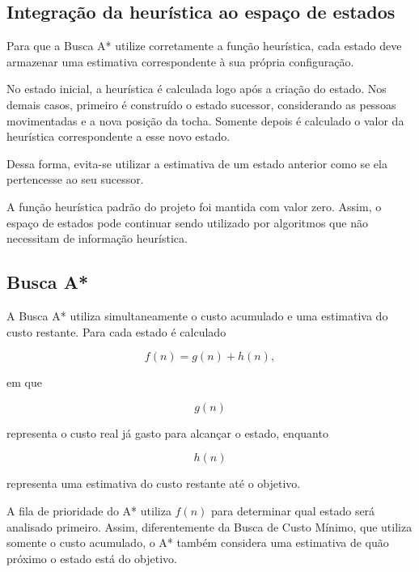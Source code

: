 \documentclass[12pt,a4paper]{article}
\begin{document}
\subsection{Integração da heurística ao espaço de estados}

Para que a Busca A* utilize corretamente a função heurística, cada estado deve
armazenar uma estimativa correspondente à sua própria configuração.

No estado inicial, a heurística é calculada logo após a criação do estado. Nos
demais casos, primeiro é construído o estado sucessor, considerando as pessoas
movimentadas e a nova posição da tocha. Somente depois é calculado o valor da
heurística correspondente a esse novo estado.

Dessa forma, evita-se utilizar a estimativa de um estado anterior como se ela
pertencesse ao seu sucessor.

A função heurística padrão do projeto foi mantida com valor zero. Assim, o
espaço de estados pode continuar sendo utilizado por algoritmos que não
necessitam de informação heurística.




\subsection{Busca A*}

A Busca A* utiliza simultaneamente o custo acumulado e uma estimativa do custo
restante. Para cada estado é calculado

\[
f(n)=g(n)+h(n),
\]

em que

\[
g(n)
\]

representa o custo real já gasto para alcançar o estado, enquanto

\[
h(n)
\]

representa uma estimativa do custo restante até o objetivo.

A fila de prioridade do A* utiliza $f(n)$ para determinar qual estado será
analisado primeiro. Assim, diferentemente da Busca de Custo Mínimo, que utiliza
somente o custo acumulado, o A* também considera uma estimativa de quão próximo
o estado está do objetivo.
\end{document}
